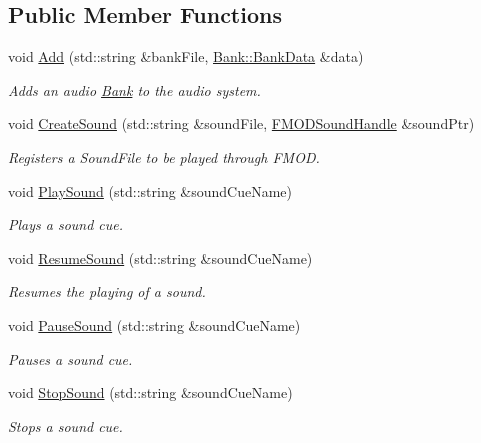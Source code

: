 \subsection*{Public Member Functions}
\begin{DoxyCompactItemize}
\item 
void \hyperlink{classDCEngine_1_1Systems_1_1Audio_a72be5cf056ad0d270796be33a3010fd1}{Add} (std\-::string \&bank\-File, \hyperlink{structDCEngine_1_1Bank_1_1BankData}{Bank\-::\-Bank\-Data} \&data)
\begin{DoxyCompactList}\small\item\em Adds an audio \hyperlink{classDCEngine_1_1Bank}{Bank} to the audio system. \end{DoxyCompactList}\item 
void \hyperlink{classDCEngine_1_1Systems_1_1Audio_a91b9a87f44307937d5f7a597456e1e96}{Create\-Sound} (std\-::string \&sound\-File, \hyperlink{classDCEngine_1_1FMODSoundHandle}{F\-M\-O\-D\-Sound\-Handle} \&sound\-Ptr)
\begin{DoxyCompactList}\small\item\em Registers a Sound\-File to be played through F\-M\-O\-D. \end{DoxyCompactList}\item 
void \hyperlink{classDCEngine_1_1Systems_1_1Audio_a990c57ddc737fd6152bf2f193c41bf46}{Play\-Sound} (std\-::string \&sound\-Cue\-Name)
\begin{DoxyCompactList}\small\item\em Plays a sound cue. \end{DoxyCompactList}\item 
void \hyperlink{classDCEngine_1_1Systems_1_1Audio_a25cef2ad0d520f38089854092caa488e}{Resume\-Sound} (std\-::string \&sound\-Cue\-Name)
\begin{DoxyCompactList}\small\item\em Resumes the playing of a sound. \end{DoxyCompactList}\item 
void \hyperlink{classDCEngine_1_1Systems_1_1Audio_a3cacbad9590e1eb47a8835c342e86742}{Pause\-Sound} (std\-::string \&sound\-Cue\-Name)
\begin{DoxyCompactList}\small\item\em Pauses a sound cue. \end{DoxyCompactList}\item 
void \hyperlink{classDCEngine_1_1Systems_1_1Audio_aaf100dab7a69eb0e1a5068efff6b2774}{Stop\-Sound} (std\-::string \&sound\-Cue\-Name)
\begin{DoxyCompactList}\small\item\em Stops a sound cue. \end{DoxyCompactList}\item 

\end{DoxyCompactItemize}
